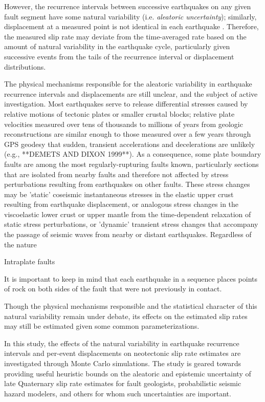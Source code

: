 \documentclass[se, manuscript]{copernicus}
\begin{document}
However, the recurrence intervals between successive earthquakes on any
given fault segment have some natural variability (i.e. \emph{aleatoric
uncertainty}); similarly, displacement at a measured point is not
identical in each earthquake \citep[e.g.]{duross_holocene_2008}.
Therefore, the measured slip rate may deviate from the time-averaged
rate based on the amount of natural variability in the earthquake cycle,
particularly given successive events from the tails of the recurrence
interval or displacement distributions.

The physical mechanisms responsible for the aleatoric variability in earthquake
recurrence intervals and displacements are still unclear, and the subject of
active investigation. Most earthquakes serve to release differential stresses
caused by relative motions of tectonic plates or smaller crustal blocks;
relative plate velocities measured over tens of thousands to millions of years
from geologic reconstructions are similar enough to those measured over a few
years through GPS geodesy that sudden, transient accelerations and decelerations
are unlikely (e.g., **DEMETS AND DIXON 1999**). As a consequence, some plate
boundary faults are among the most regularly-rupturing faults known,
particularly sections that are isolated from nearby faults
\citep[e.g.]{berryman_major_2012} and therefore not affected by stress
perturbations resulting from earthquakes on other faults. These stress changes
may be 'static' coseismic instantaneous stresses in the elastic upper crust resulting from
earthquake displacement, or analogous stress changes in the viscoelastic lower
crust or upper mantle from the time-dependent relaxation of static stress
perturbations, or 'dynamic' transient stress changes that accompany the passage
of seismic waves from nearby or distant earthquakes. Regardless of the nature

Intraplate faults 

It is important to keep in mind that each earthquake in a sequence places
points of rock on both sides of the fault that were not previously in contact.




Though the physical mechanisms
responsible and the statistical character of this natural variability
remain under debate, its effects on the estimated slip rates may still
be estimated given some common parameterizations. 



In this study, the effects of the natural variability in earthquake
recurrence intervals and per-event displacements on neotectonic slip
rate estimates are investigated through Monte Carlo simulations. The
study is geared towards providing useful heuristic bounds on the
aleatoric and epistemic uncertainty of late Quaternary slip rate
estimates for fault geologists, probabilistic seismic hazard modelers,
and others for whom such uncertainties are important.
\end{document}
